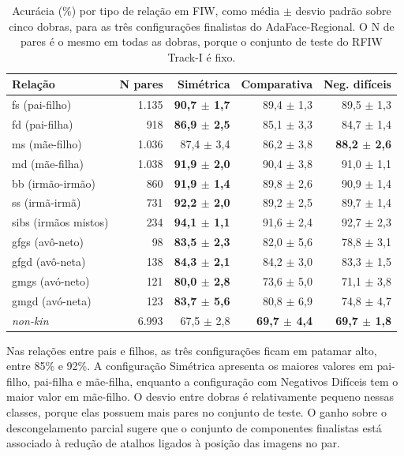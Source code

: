 \begin{table}[htbp]
\centering
\small
\setlength{\tabcolsep}{3pt}
\caption{Acurácia (\%) por tipo de relação em FIW, como média $\pm$ desvio padrão sobre cinco dobras, para as três configurações finalistas do AdaFace-Regional. O N de pares é o mesmo em todas as dobras, porque o conjunto de teste do RFIW Track-I é fixo.}
\label{tab:per_rel_compare}
\begin{tabular}{lrrrr}
\hline
\textbf{Relação} & \textbf{N pares} & \textbf{Simétrica} & \textbf{Comparativa} & \textbf{Neg. difíceis} \\
\hline
fs (pai-filho)      & 1.135 & \textbf{90{,}7 $\pm$ 1{,}7} & 89{,}4 $\pm$ 1{,}3 & 89{,}5 $\pm$ 1{,}3 \\
fd (pai-filha)      & 918   & \textbf{86{,}9 $\pm$ 2{,}5} & 85{,}1 $\pm$ 3{,}3 & 84{,}7 $\pm$ 1{,}4 \\
ms (mãe-filho)      & 1.036 & 87{,}4 $\pm$ 3{,}4 & 86{,}2 $\pm$ 3{,}8 & \textbf{88{,}2 $\pm$ 2{,}6} \\
md (mãe-filha)      & 1.038 & \textbf{91{,}9 $\pm$ 2{,}0} & 90{,}4 $\pm$ 3{,}8 & 91{,}0 $\pm$ 1{,}1 \\
bb (irmão-irmão)    & 860   & \textbf{91{,}9 $\pm$ 1{,}4} & 89{,}8 $\pm$ 2{,}6 & 90{,}9 $\pm$ 1{,}4 \\
ss (irmã-irmã)      & 731   & \textbf{92{,}2 $\pm$ 2{,}0} & 89{,}2 $\pm$ 2{,}5 & 89{,}7 $\pm$ 1{,}4 \\
sibs (irmãos mistos) & 234   & \textbf{94{,}1 $\pm$ 1{,}1} & 91{,}6 $\pm$ 2{,}4 & 92{,}7 $\pm$ 2{,}3 \\
\hline
gfgs (avô-neto)     & 98  & \textbf{83{,}5 $\pm$ 2{,}3} & 82{,}0 $\pm$ 5{,}6 & 78{,}8 $\pm$ 3{,}1 \\
gfgd (avô-neta)     & 138 & \textbf{84{,}3 $\pm$ 2{,}1} & 84{,}2 $\pm$ 3{,}0 & 83{,}3 $\pm$ 1{,}5 \\
gmgs (avó-neto)     & 121 & \textbf{80{,}0 $\pm$ 2{,}8} & 73{,}6 $\pm$ 5{,}0 & 71{,}1 $\pm$ 3{,}8 \\
gmgd (avó-neta)     & 123 & \textbf{83{,}7 $\pm$ 5{,}6} & 80{,}8 $\pm$ 6{,}9 & 74{,}8 $\pm$ 4{,}7 \\
\hline
\textit{non-kin}             & 6.993 & 67{,}5 $\pm$ 2{,}8 & \textbf{69{,}7 $\pm$ 4{,}4} & \textbf{69{,}7 $\pm$ 1{,}8} \\
\hline
\end{tabular}
\end{table}

Nas relações entre pais e filhos, as três configurações ficam em patamar alto, entre 85\% e 92\%. A configuração Simétrica apresenta os maiores valores em pai-filho, pai-filha e mãe-filha, enquanto a configuração com Negativos Difíceis tem o maior valor em mãe-filho. O desvio entre dobras é relativamente pequeno nessas classes, porque elas possuem mais pares no conjunto de teste. O ganho sobre o descongelamento parcial sugere que o conjunto de componentes finalistas está associado à redução de atalhos ligados à posição das imagens no par.

